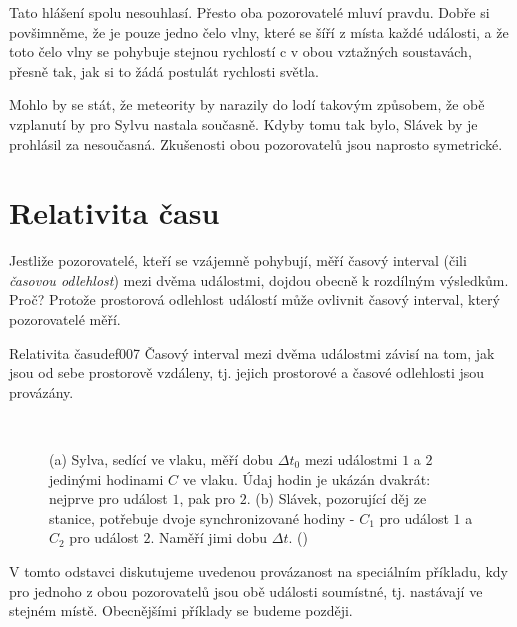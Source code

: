       Tato hlášení spolu nesouhlasí. Přesto oba pozorovatelé mluví pravdu. Dobře si povšimněme, že
      je pouze jedno čelo vlny, které se šíří z místa každé události, a že toto čelo vlny se
      pohybuje stejnou rychlostí c v obou vztažných soustavách, přesně tak, jak si to žádá postulát
      rychlosti světla.

      Mohlo by se stát, že meteority by narazily do lodí takovým způsobem, že obě vzplanutí by pro
      Sylvu nastala současně. Kdyby tomu tak bylo, Slávek by je prohlásil za nesoučasná. Zkušenosti
      obou pozorovatelů jsou naprosto symetrické.
  
  \section{Relativita času}
    Jestliže pozorovatelé, kteří se vzájemně pohybují, měří časový interval (čili \emph{časovou
    odlehlost}) mezi dvěma událostmi, dojdou obecně k rozdílným výsledkům. Proč? Protože prostorová
    odlehlost událostí může ovlivnit časový interval, který pozorovatelé měří.  
    
    \begin{fyzdef}{Relativita času}{def007}
      Časový interval mezi dvěma událostmi závisí na tom, jak jsou od sebe prostorově vzdáleny, tj.
      jejich prostorové a časové odlehlosti jsou provázány.
    \end{fyzdef}

    \begin{figure}[ht!]  %
      \centering
         \\    
      \caption{(a) Sylva, sedící ve vlaku, měří dobu \(\Delta t_0\) mezi událostmi \(1\) a \(2\)
        jedinými hodinami \(C\) ve vlaku. Údaj hodin je ukázán dvakrát: nejprve pro událost \(1\),
        pak pro \(2\). (b) Slávek, pozorující děj ze stanice, potřebuje dvoje synchronizované hodiny
        - \(C_1\) pro událost \(1\) a \(C_2\) pro událost \(2\). Naměří jimi dobu \(\Delta t\).
        (\cite[s.~1011]{Halliday2001})}
      \label{fyz:fig0912}
    \end{figure}

    V tomto odstavci diskutujeme uvedenou provázanost na speciálním příkladu, kdy pro jednoho z obou
    pozorovatelů jsou obě události soumístné, tj. nastávají ve stejném místě. Obecnějšími příklady
    se budeme později.

